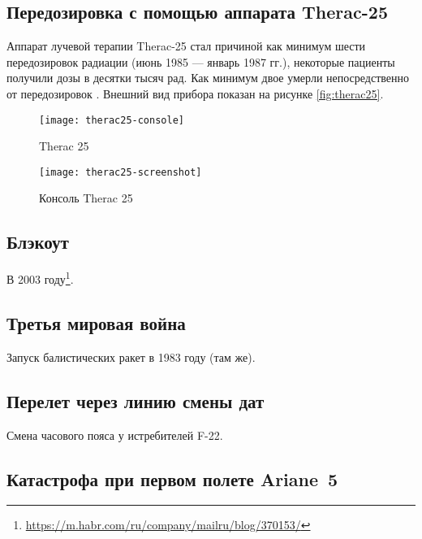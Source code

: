 \subsection{Передозировка с помощью аппарата Therac-25}

Аппарат лучевой терапии Therac-25 стал причиной как минимум шести передозировок радиации (июнь 1985 --- январь 1987 гг.),
некоторые пациенты получили дозы в десятки тысяч рад. Как минимум двое умерли непосредственно от передозировок \cite{journal:computer:1993:therac25}.
Внешний вид прибора показан на рисунке \ref{fig:therac25}.

\begin{center}
    \begin{figure}[hb!]
        \texttt{[image: therac25-console]}
        \caption{Therac 25}\label{fig:therac25}
        \texttt{[image: therac25-screenshot]}
        \caption{Консоль Therac 25}\label{fig:therac25_console}
    \end{figure}
\end{center}
    
    
\subsection{Блэкоут}

В 2003 году\footnote{\url{https://m.habr.com/ru/company/mailru/blog/370153/}}.


\subsection{Третья мировая война}

Запуск балистических ракет в 1983 году (там же).


\subsection{Перелет через линию смены дат}

Смена часового пояса у истребителей F-22. 


\subsection{Катастрофа при первом полете Ariane~5}

